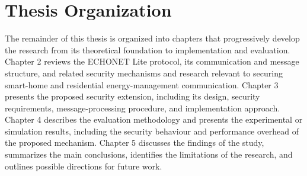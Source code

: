\section{Thesis Organization}

The remainder of this thesis is organized into chapters that progressively develop the research from its theoretical foundation to implementation and evaluation. Chapter 2 reviews the ECHONET Lite protocol, its communication and message structure, and related security mechanisms and research relevant to securing smart-home and residential energy-management communication. Chapter 3 presents the proposed security extension, including its design, security requirements, message-processing procedure, and implementation approach. Chapter 4 describes the evaluation methodology and presents the experimental or simulation results, including the security behaviour and performance overhead of the proposed mechanism. Chapter 5 discusses the findings of the study, summarizes the main conclusions, identifies the limitations of the research, and outlines possible directions for future work.







